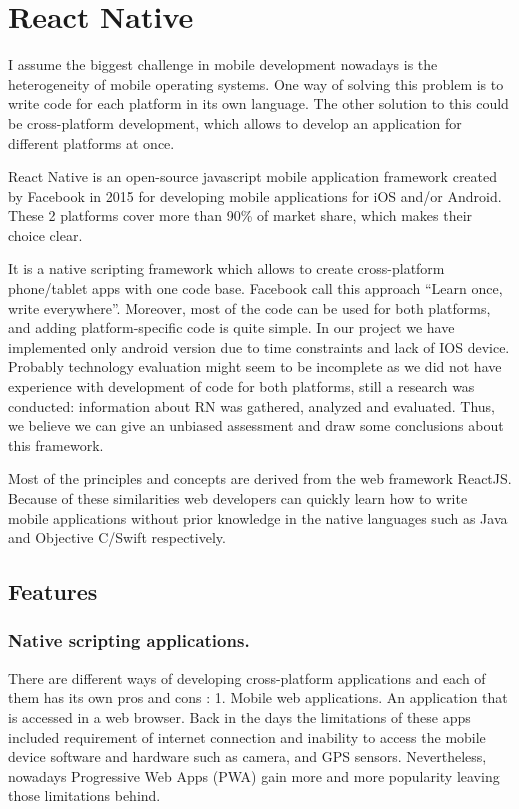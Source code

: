 
\section{React Native}
I assume the biggest challenge in mobile development nowadays is the heterogeneity of mobile operating systems. One way of solving this problem is to write code for each platform in its own language. The other solution to this could be cross-platform development, which allows to develop an application for different platforms at once. 

React Native is an open-source javascript mobile application framework created by Facebook in 2015 for developing mobile applications for iOS and/or Android. These 2 platforms cover more than 90\% of market share, which makes their choice clear.

It is a native scripting framework which allows to create cross-platform phone/tablet apps with one code base. Facebook call this approach “Learn once, write everywhere”. Moreover, most of the code can be used for both platforms, and adding platform-specific code is quite simple. In our project we have implemented only android version due to time constraints and lack of IOS device.
Probably technology evaluation might seem to be incomplete as we did not have experience with development of code for both platforms, still a research was conducted:
information about RN was gathered, analyzed and evaluated. 
Thus, we believe we can give an unbiased assessment and draw some conclusions about this framework. 

Most of the principles and concepts are derived from the web framework ReactJS. Because of these similarities web developers can quickly learn how to write mobile applications without prior knowledge in the native languages such as Java and Objective C/Swift respectively.

\subsection{Features}
\subsubsection{Native scripting applications.}
There are different ways of developing cross-platform applications and each of them has its own pros and cons \cite{hansson2016effects}:
1. Mobile web applications.
An application that is accessed in a web browser. Back in the days the limitations of these apps included  requirement of internet connection and inability to access the mobile device software and hardware such as camera, and GPS sensors. Nevertheless, nowadays Progressive Web Apps (PWA) gain more and more popularity leaving those limitations behind.

